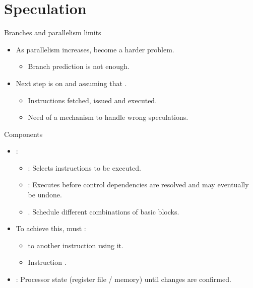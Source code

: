 \section{Speculation}

\begin{frame}[t]{Branches and parallelism limits}
\begin{itemize}
  \item As parallelism increases,  become a harder problem.
    \begin{itemize}
      \item Branch prediction is not enough.
    \end{itemize}

  \item Next step is  on 
         and  
        assuming that .
    \begin{itemize}
      \item Instructions fetched, issued and executed.
      \item Need of a mechanism to handle wrong speculations.
    \end{itemize}
\end{itemize}
\end{frame}

\begin{frame}[t]{Components}
\begin{itemize}
  \item {}:
    \begin{itemize}
      \item {}: 
            Selects instructions to be executed.
      \item {}: 
            Executes before control dependencies are resolved and may eventually be undone.
      \item {}.
            Schedule different combinations of basic blocks.
    \end{itemize}

  \item To achieve this, must :
    \begin{itemize}
      \item {} to another instruction using it.
      \item Instruction .
    \end{itemize}

  \item {}:
        Processor state (register file / memory)  until changes are confirmed.
\end{itemize}
\end{frame}

